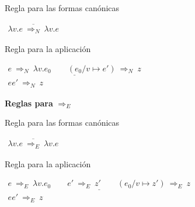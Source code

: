\documentclass[handout]{beamer}
\begin{document}
Regla para las formas canónicas

$\begin{array}{c}
\overline{\lambda v.e\ \Rightarrow_N\ \lambda v.e}
\end{array}
$

\smallskip

Regla para la aplicación

\smallskip

$\begin{array}{c}
\underline{e\ \Rightarrow_N\ \lambda v.e_0\qquad (e_0/v\mapsto e')\ \Rightarrow_N\ z}\\
ee'\ \Rightarrow_N\ z
\end{array}
$

\smallskip

\textbf{Reglas para} $\Rightarrow_E$

Regla para las formas canónicas

$\begin{array}{c}
\overline{\lambda v.e\ \Rightarrow_E\ \lambda v.e}
\end{array}
$

\smallskip

Regla para la aplicación

\smallskip

$\begin{array}{c}
\underline{e\ \Rightarrow_E\ \lambda v.e_0\qquad e'\ \Rightarrow_E\ z'\qquad(e_0/v\mapsto z')\ \Rightarrow_E\ z}\\
ee'\ \Rightarrow_E\ z
\end{array}
$

\end{document}
